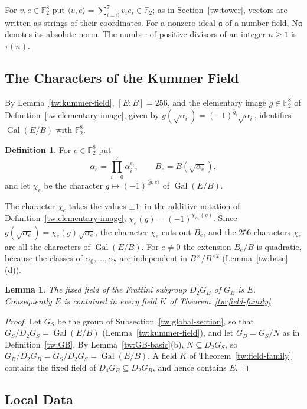 \documentclass[11pt]{amsart}
\numberwithin{equation}{section}
\newtheorem{lemma}[equation]{Lemma}
\theoremstyle{definition}
\newtheorem{definition}[equation]{Definition}
\theoremstyle{remark}
\DeclareMathOperator{\Gal}{Gal}
\newcommand{\Ftwo}{\mathbb F_2}
\begin{document}
For $v,e\in\Ftwo^8$ put $\langle v,e\rangle=\sum_{i=0}^7v_ie_i\in\Ftwo$; as
in Section~\ref{tw:tower}, vectors are written as strings of their
coordinates. For a nonzero ideal $\mathfrak a$ of a number field,
$\mathrm N\mathfrak a$ denotes its absolute norm. The number of positive
divisors of an integer $n\ge1$ is $\tau(n)$.

\subsection{The Characters of the Kummer Field}
By Lemma~\ref{tw:kummer-field}, $[E:B]=256$, and the elementary image
$\bar g\in\Ftwo^8$ of Definition~\ref{tw:elementary-image}, given by
$g(\sqrt{\alpha_i})=(-1)^{\bar g_i}\sqrt{\alpha_i}$, identifies $\Gal(E/B)$
with $\Ftwo^8$.

\begin{definition}\label{gf:characters}
For $e\in\Ftwo^8$ put
\[
 \alpha_e=\prod_{i=0}^7\alpha_i^{e_i},\qquad B_e=B(\sqrt{\alpha_e}),
\]
and let $\chi_e$ be the character $g\mapsto(-1)^{\langle\bar g,e\rangle}$ of
$\Gal(E/B)$.
\end{definition}

The character $\chi_e$ takes the values $\pm1$; in the additive notation of
Definition~\ref{tw:elementary-image}, $\chi_e(g)=(-1)^{\chi_{\alpha_e}(g)}$.
Since $g(\sqrt{\alpha_e})=\chi_e(g)\sqrt{\alpha_e}$,
the character $\chi_e$ cuts out $B_e$, and the $256$ characters $\chi_e$ are
all the characters of $\Gal(E/B)$. For $e\ne0$ the extension $B_e/B$ is
quadratic, because the classes of $\alpha_0,\ldots,\alpha_7$ are independent
in $B^\times/B^{\times2}$ (Lemma~\ref{tw:base}(d)).

\begin{lemma}\label{gf:in-tower}
The fixed field of the Frattini subgroup $D_2G_B$ of $G_B$ is $E$.
Consequently $E$ is contained in every field $K$ of
Theorem~\ref{tw:field-family}.
\end{lemma}

\begin{proof}
Let $G_S$ be the group of Subsection~\ref{tw:global-section}, so
that $G_S/D_2G_S=\Gal(E/B)$ (Lemma~\ref{tw:kummer-field}), and let
$G_B=G_S/N$ as in Definition~\ref{tw:GB}. By Lemma~\ref{tw:GB-basic}(b),
$N\subseteq D_2G_S$, so
$G_B/D_2G_B=G_S/D_2G_S=\Gal(E/B)$. A field $K$ of
Theorem~\ref{tw:field-family} contains the fixed field of
$D_4G_B\subseteq D_2G_B$, and hence contains $E$.
\end{proof}

\subsection{Local Data}
\end{document}
